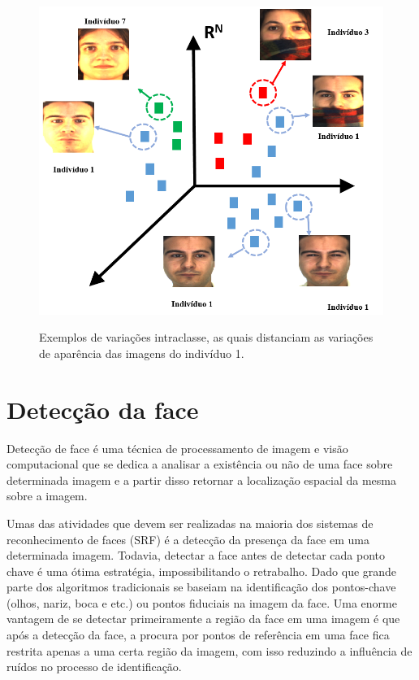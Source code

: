 \begin{figure}[H]
\centering
\caption{Exemplos de variações intraclasse, as quais distanciam as variações de aparência das imagens do indivíduo 1.}
\includegraphics[scale = 0.50]{imgs/xyz2}
\label{fig:variacoesAparencia}
\end{figure}



\section{Detecção da face}
\label{sec:detecção face}

Detecção de face é uma técnica de processamento de imagem e visão computacional que se dedica a analisar a existência ou não de uma face sobre determinada imagem e a partir disso retornar a localização espacial da mesma sobre a imagem.


Umas das atividades que devem ser realizadas na maioria dos sistemas de reconhecimento de faces (SRF) é a detecção da presença da face em uma determinada imagem. Todavia, detectar a face antes de detectar cada ponto chave é uma ótima estratégia, impossibilitando o retrabalho. Dado que grande parte dos algoritmos tradicionais se baseiam na identificação dos pontos-chave (olhos, nariz, boca e etc.) ou pontos fiduciais na imagem da face. Uma enorme vantagem de se detectar primeiramente a região da face em uma imagem é que após a detecção da face, a procura por pontos de referência em uma face fica restrita apenas a uma certa região da imagem, com isso reduzindo a influência de ruídos no processo de identificação.


